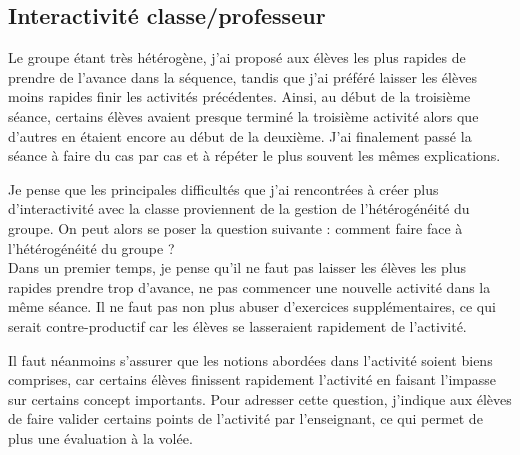 \documentclass[pdftex,a4paper,12pt]{article}
\begin{document}
	\subsection{Interactivité classe/professeur}
	Le groupe étant très hétérogène, j'ai proposé aux élèves les plus rapides de prendre de l'avance dans la séquence, 
	tandis que j'ai préféré laisser les élèves moins rapides finir les activités précédentes.
	Ainsi, au début de la troisième séance, certains élèves avaient presque terminé la troisième activité alors que d'autres en étaient encore au début de la deuxième.
	J'ai finalement passé la séance à faire du cas par cas et à répéter le plus souvent les mêmes explications.

	Je pense que les principales difficultés que j'ai rencontrées à créer plus d'interactivité avec la classe proviennent de la gestion de l'hétérogénéité du groupe.
	On peut alors se poser la question suivante : comment faire face à l'hétérogénéité du groupe ?\\

	Dans un premier temps, je pense qu'il ne faut pas laisser les élèves les plus rapides prendre trop d'avance, 
	ne pas commencer une nouvelle activité dans la même séance.
	Il ne faut pas non plus abuser d'exercices supplémentaires, ce qui serait contre-productif car les élèves se lasseraient rapidement de l'activité.

	Il faut néanmoins s'assurer que les notions abordées dans l'activité soient biens comprises, 
	car certains élèves finissent rapidement l'activité en faisant l'impasse sur certains concept importants.
	Pour adresser cette question, j'indique aux élèves de faire valider certains points de l'activité par l'enseignant, ce qui permet de plus une évaluation à la volée.
\end{document}
